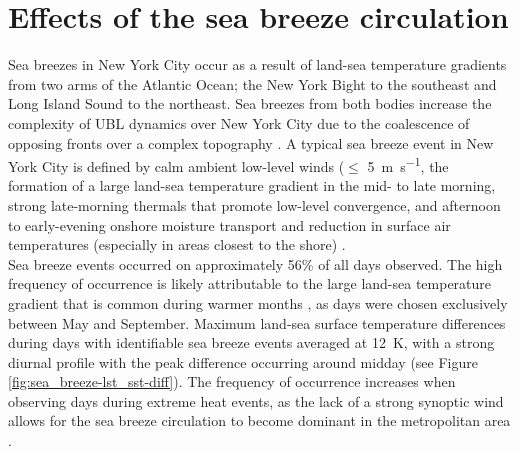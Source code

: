 \documentclass[num-refs]{wiley-article}
\begin{document}
\section{Effects of the sea breeze circulation} \label{section:sea_breeze_effects} 
Sea breezes in New York City occur as a result of land-sea temperature gradients from two arms of the Atlantic Ocean; the New York Bight to the southeast and Long Island Sound to the northeast. Sea breezes from both bodies increase the complexity of UBL dynamics over New York City due to the coalescence of opposing fronts over a complex topography \citep{bornstein1981}. A typical sea breeze event in New York City is defined by calm ambient low-level winds ($\leq$ \SI{5}{\meter\per\second}, the formation of a large land-sea temperature gradient in the mid- to late morning, strong late-morning thermals that promote low-level convergence, and afternoon to early-evening onshore moisture transport and reduction in surface air temperatures (especially in areas closest to the shore) \citep{childs2005, frizzola1963, gedzelman2003}. 
\\
Sea breeze events occurred on approximately 56\% of all days observed. The high frequency of occurrence is likely attributable to the large land-sea temperature gradient that is common during warmer months \citep{gedzelman2003}, as days were chosen exclusively between May and September. Maximum land-sea surface temperature differences during days with identifiable sea breeze events averaged at \SI{12}{\kelvin}, with a strong diurnal profile with the peak difference occurring around midday (see Figure \ref{fig:sea_breeze-lst_sst-diff}). The frequency of occurrence increases when observing days during extreme heat events, as the lack of a strong synoptic wind allows for the sea breeze circulation to become dominant in the metropolitan area \citep{miller2003}. 
\end{document}
